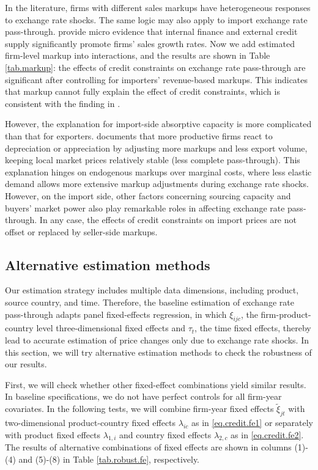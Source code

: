In the literature, firms with different sales markups have heterogeneous responses to exchange rate shocks. The same logic may also apply to import exchange rate pass-through. \cite{llz2018} provide micro evidence that internal finance and external credit supply significantly promote firms' sales growth rates. Now we add estimated firm-level markup into interactions, and the results are shown in Table \ref{tab.markup}: the effects of credit constraints on exchange rate pass-through are significant after controlling for importers' revenue-based markups. This indicates that markup cannot fully explain the effect of credit constraints, which is consistent with the finding in \cite{xu-guo2021}.

However, the explanation for import-side absorptive capacity is more complicated than that for exporters. \cite{bmm2012} documents that more productive firms react to depreciation or appreciation by adjusting more markups and less export volume, keeping local market prices relatively stable (less complete pass-through). This explanation hinges on endogenous markups over marginal costs, where less elastic demand allows more extensive markup adjustments during exchange rate shocks. However, on the import side, other factors concerning sourcing capacity and buyers' market power also play remarkable roles in affecting exchange rate pass-through. In any case, the effects of credit constraints on import prices are not offset or replaced by seller-side markups.

\subsection{Alternative estimation methods}

Our estimation strategy includes multiple data dimensions, including product, source country, and time. Therefore, the baseline estimation of exchange rate pass-through adapts panel fixed-effects regression, in which $\xi_{ijc}$, the firm-product-country level three-dimensional fixed effects and $\tau_t$, the time fixed effects, thereby lead to accurate estimation of price changes only due to exchange rate shocks. In this section, we will try alternative estimation methods to check the robustness of our results.

First, we will check whether other fixed-effect combinations yield similar results. In baseline specifications, we do not have perfect controls for all firm-year covariates. In the following tests, we will combine firm-year fixed effects $\tilde{\xi}_{jt}$ with two-dimensional product-country fixed effects $\lambda_{ic}$ as in \ref{eq.credit.fe1} or separately with product fixed effects $\lambda_{1, i}$ and country fixed effects $\lambda_{2, c}$ as in \ref{eq.credit.fe2}. The results of alternative combinations of fixed effects are shown in columns (1)-(4) and (5)-(8) in Table \ref{tab.robust.fe}, respectively. 

